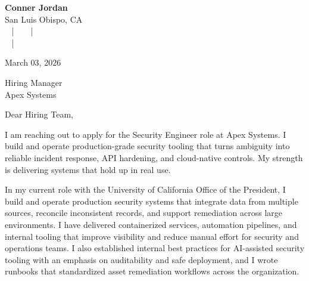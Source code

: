 \documentclass[letterpaper,11pt]{article}
\newcommand{\companyname}{Apex Systems}
\begin{document}
\begin{center}
  {\Huge \textbf{Conner Jordan}}\\[4pt]
  {\Large San Luis Obispo, CA}\\[4pt]
  \href{tel:+18059759793}{
    } ~ | ~
  \href{mailto:connercharlesjordan@gmail.com}{
    } ~ | ~
   \\
  \href{https://www.linkedin.com/in/conner-jordan-4b268514a/}{
    } ~ | ~
  \href{https://github.com/cjordan223}{
    }
\end{center}

\vspace{16pt}

\begin{flushright}
March 03, 2026
\end{flushright}

Hiring Manager\\
\companyname

\vspace{26pt}

\noindent
Dear Hiring Team,

\vspace{16pt}

I am reaching out to apply for the Security Engineer role at Apex Systems. I build and operate production-grade security tooling that turns ambiguity into reliable incident response, API hardening, and cloud-native controls. My strength is delivering systems that hold up in real use.

\vspace{16pt}

In my current role with the University of California Office of the President, I build and operate production security systems that integrate data from multiple sources, reconcile inconsistent records, and support remediation across large environments. I have delivered containerized services, automation pipelines, and internal tooling that improve visibility and reduce manual effort for security and operations teams. I also established internal best practices for AI-assisted security tooling with an emphasis on auditability and safe deployment, and I wrote runbooks that standardized asset remediation workflows across the organization.
\end{document}
